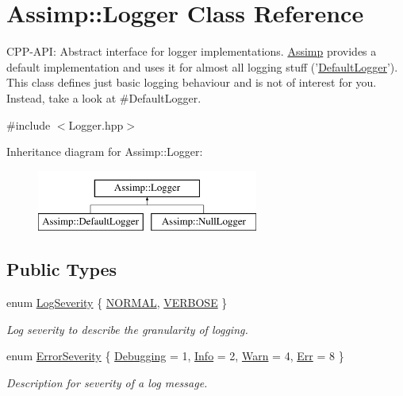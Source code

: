 \hypertarget{classAssimp_1_1Logger}{\section{\-Assimp\-:\-:\-Logger \-Class \-Reference}
\label{classAssimp_1_1Logger}
}


\-C\-P\-P-\/\-A\-P\-I\-: \-Abstract interface for logger implementations. \hyperlink{namespaceAssimp}{\-Assimp} provides a default implementation and uses it for almost all logging stuff ('\hyperlink{classAssimp_1_1DefaultLogger}{\-Default\-Logger}'). \-This class defines just basic logging behaviour and is not of interest for you. \-Instead, take a look at \#\-Default\-Logger.  




{\ttfamily \#include $<$\-Logger.\-hpp$>$}

\-Inheritance diagram for \-Assimp\-:\-:\-Logger\-:\begin{figure}[H]
\begin{center}
\leavevmode
\includegraphics[height=2.000000cm]{classAssimp_1_1Logger}
\end{center}
\end{figure}
\subsection*{\-Public \-Types}
\begin{DoxyCompactItemize}
\item 
enum \hyperlink{classAssimp_1_1Logger_a8b6248a0fd062431e8572556350d29e6}{\-Log\-Severity} \{ \hyperlink{classAssimp_1_1Logger_a8b6248a0fd062431e8572556350d29e6a79d16f85dc21486ee489f300027e8eda}{\-N\-O\-R\-M\-A\-L}, 
\hyperlink{classAssimp_1_1Logger_a8b6248a0fd062431e8572556350d29e6afc9d1d86aa82fdb80e00c99b3c1ce486}{\-V\-E\-R\-B\-O\-S\-E}
 \}
\begin{DoxyCompactList}\small\item\em \-Log severity to describe the granularity of logging. \end{DoxyCompactList}\item 
enum \hyperlink{classAssimp_1_1Logger_acd0b52a87d6fc11e957ed2c6e2ad75b6}{\-Error\-Severity} \{ \hyperlink{classAssimp_1_1Logger_acd0b52a87d6fc11e957ed2c6e2ad75b6a0cb475014d27098c3423738c571d857f}{\-Debugging} =  1, 
\hyperlink{classAssimp_1_1Logger_acd0b52a87d6fc11e957ed2c6e2ad75b6aa3377a574928b86f7de55c5df154f461}{\-Info} =  2, 
\hyperlink{classAssimp_1_1Logger_acd0b52a87d6fc11e957ed2c6e2ad75b6a1279c77aaee5a3d7df835a9b9305a697}{\-Warn} =  4, 
\hyperlink{classAssimp_1_1Logger_acd0b52a87d6fc11e957ed2c6e2ad75b6a71054d0b1323abcea46d050d69013d27}{\-Err} =  8
 \}
\begin{DoxyCompactList}\small\item\em \-Description for severity of a log message. \end{DoxyCompactList}\end{DoxyCompactItemize}
